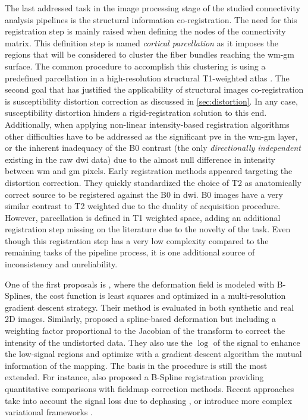 The last addressed task in the image processing stage of the studied 
connectivity analysis pipelines is the structural information co-registration.
The need for this registration step is mainly raised when defining the 
nodes of the connectivity matrix. This definition step is named
\textit{cortical parcellation} as it imposes the regions that will be
considered to cluster the fiber bundles reaching the \gls{wm}-\gls{gm}
surface. The common procedure to accomplish this clustering is using
a predefined parcellation in a high-resolution structural T1-weighted 
atlas \citep{greve_accurate_2009}. The second goal that has justified the applicability of structural
images co-registration is susceptibility distortion correction
as discussed in \autoref{sec:distortion}. In any case, susceptibility 
distortion hinders a rigid-registration solution to this end.
Additionally, when applying non-linear intensity-based
registration algorithms other difficulties have to be addressed as
the significant \gls{pve} in the \gls{wm}-\gls{gm} layer, or the
inherent inadequacy of the B0 contrast (the only \textit{directionally
independent} existing in the raw \gls{dwi} data) due to the almost null
difference in intensity between \gls{wm} and \gls{gm} pixels. Early 
registration methods appeared targeting the distortion correction.
They quickly standardized the choice of T2 as anatomically correct source
to be registered against the B0 in \gls{dwi}. B0 images have a very similar
contrast to T2 weighted due to the duality of acquisition procedure. However,
parcellation is defined in T1 weighted space, adding an additional registration
step missing on the literature due to the novelty of the task. Even though this
registration step has a very low complexity compared to the remaining tasks of 
the pipeline process, it is one additional source of inconsistency and unreliability.


One of the first proposals is \citep{kybic_unwarping_2000}, where the deformation
field is modeled with B-Splines, the cost function is least squares and optimized
in a multi-resolution gradient descent strategy. Their method is evaluated in 
both synthetic and real 2D images. Similarly,
\citep{studholme_accurate_2000} proposed a spline-based deformation but including
a weighting factor proportional to the Jacobian of the transform to correct the
intensity of the undistorted data. They also use the $\log$ of the signal to
enhance the low-signal regions and optimize with a gradient descent algorithm
the mutual information of the mapping. The basis in the procedure is still the most 
extended. For instance, \citep{wu_comparison_2008} also proposed a B-Spline registration
providing quantitative comparisons with fieldmap correction methods. Recent approaches
take into account the signal loss due to dephasing \citep{li_accounting_2007}, or 
introduce more complex variational frameworks \citep{tao_variational_2009}.


